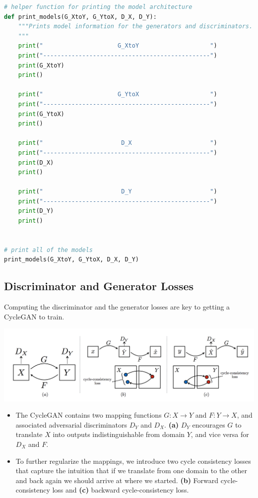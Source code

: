 \begin{lstlisting}[language=Python]
# helper function for printing the model architecture
def print_models(G_XtoY, G_YtoX, D_X, D_Y):
    """Prints model information for the generators and discriminators.
    """
    print("                     G_XtoY                    ")
    print("-----------------------------------------------")
    print(G_XtoY)
    print()

    print("                     G_YtoX                    ")
    print("-----------------------------------------------")
    print(G_YtoX)
    print()

    print("                      D_X                      ")
    print("-----------------------------------------------")
    print(D_X)
    print()

    print("                      D_Y                      ")
    print("-----------------------------------------------")
    print(D_Y)
    print()
    

# print all of the models
print_models(G_XtoY, G_YtoX, D_X, D_Y)
\end{lstlisting}

\subsection{Discriminator and Generator Losses}

Computing the discriminator and the generator losses are key to getting
a CycleGAN to train.

\includegraphics[width=1\linewidth]{img//genAdvNet//image2image/CycleGAN_loss.png}

\begin{itemize}
\item The CycleGAN contains two mapping functions \(G: X \rightarrow Y\) and
  \(F: Y \rightarrow X\), and associated adversarial discriminators
  \(D_Y\) and \(D_X\). \textbf{(a)} \(D_Y\) encourages \(G\) to
  translate \(X\) into outputs indistinguishable from domain \(Y\), and
  vice versa for \(D_X\) and \(F\).
\item To further regularize the mappings, we introduce two cycle consistency
  losses that capture the intuition that if we translate from one domain
  to the other and back again we should arrive at where we started.
  \textbf{(b)} Forward cycle-consistency loss and \textbf{(c)} backward
  cycle-consistency loss.
\end{itemize}

